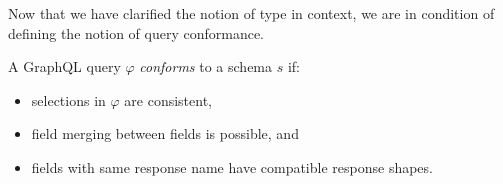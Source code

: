 
Now that we have clarified the notion of type in context, we are in condition of defining the notion of query conformance. 

\begin{definition}
A GraphQL query $\varphi$ \textit{conforms} to a schema $s$ if:
\begin{itemize}
    \item selections in $\varphi$ are consistent, 

    \item field merging between fields is possible, and

    \item fields with same response name have compatible response shapes.
\end{itemize}
\end{definition}


